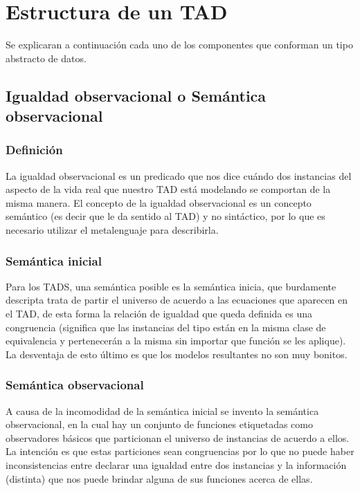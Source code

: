\documentclass[10pt, a4paper]{report}
\begin{document}
\newpage
\section{Estructura de un TAD}
Se explicaran a continuaci\'on cada uno de los componentes que conforman un tipo abstracto de datos.


\subsection{Igualdad observacional o Sem\'antica observacional}
\subsubsection*{Definici\'on}
La igualdad observacional es un predicado que nos dice cu\'ando dos instancias del aspecto de la vida real que nuestro TAD est\'a modelando se comportan de la misma manera. El concepto de la igualdad observacional es un concepto sem\'antico (es decir que le da sentido al TAD) y no sint\'actico, por lo que es necesario utilizar el metalenguaje para describirla.

\subsubsection*{Sem\'antica inicial}
Para los TADS, una sem\'antica posible es la sem\'antica inicia, que burdamente descripta trata de partir el universo de acuerdo a las ecuaciones que aparecen en el TAD, de esta forma la relaci\'on de igualdad que queda definida es una congruencia (significa que las instancias del tipo est\'an en la misma clase de equivalencia y pertenecer\'an a la misma sin importar que funci\'on se les aplique). La desventaja de esto \'ultimo es que los modelos resultantes no son muy bonitos. 

\subsubsection*{Sem\'antica observacional}
A causa de la incomodidad de la sem\'antica inicial se invento la sem\'antica observacional, en la cual hay un conjunto de funciones etiquetadas como observadores b\'asicos que particionan el universo de instancias de acuerdo a ellos. La intenci\'on es que estas particiones sean congruencias por lo que no puede haber inconsistencias entre declarar una igualdad entre dos instancias y la informaci\'on (distinta) que nos puede brindar alguna de sus funciones acerca de ellas.
\end{document}
